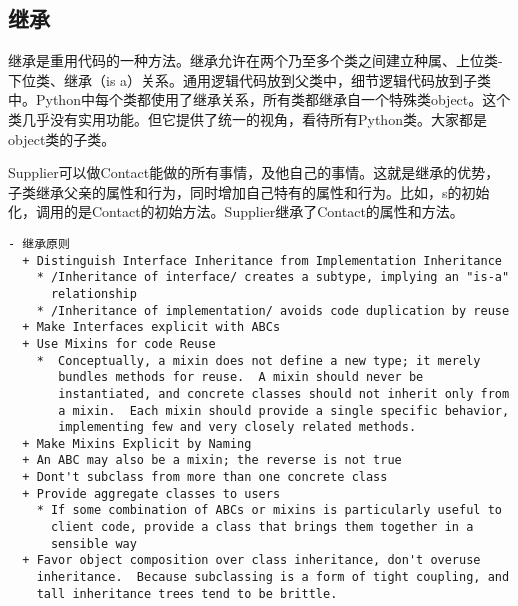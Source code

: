 \subsection{继承}
继承是重用代码的一种方法。继承允许在两个乃至多个类之间建立种属、上位类-下位类、继承（is a）关系。通用逻辑代码放到父类中，细节逻辑代码放到子类中。Python中每个类都使用了继承关系，所有类都继承自一个特殊类object。这个类几乎没有实用功能。但它提供了统一的视角，看待所有Python类。大家都是object类的子类。


Supplier可以做Contact能做的所有事情，及他自己的事情。这就是继承的优势，子类继承父亲的属性和行为，同时增加自己特有的属性和行为。比如，s的初始化，调用的是Contact的初始方法。Supplier继承了Contact的属性和方法。
\begin{framed}
  \begin{verbatim}
- 继承原则
  + Distinguish Interface Inheritance from Implementation Inheritance
    * /Inheritance of interface/ creates a subtype, implying an "is-a"
      relationship
    * /Inheritance of implementation/ avoids code duplication by reuse
  + Make Interfaces explicit with ABCs
  + Use Mixins for code Reuse
    *  Conceptually, a mixin does not define a new type; it merely
       bundles methods for reuse.  A mixin should never be
       instantiated, and concrete classes should not inherit only from
       a mixin.  Each mixin should provide a single specific behavior,
       implementing few and very closely related methods.
  + Make Mixins Explicit by Naming
  + An ABC may also be a mixin; the reverse is not true
  + Dont't subclass from more than one concrete class
  + Provide aggregate classes to users
    * If some combination of ABCs or mixins is particularly useful to
      client code, provide a class that brings them together in a
      sensible way
  + Favor object composition over class inheritance, don't overuse
    inheritance.  Because subclassing is a form of tight coupling, and
    tall inheritance trees tend to be brittle. 
\end{verbatim}
\end{framed}

    


